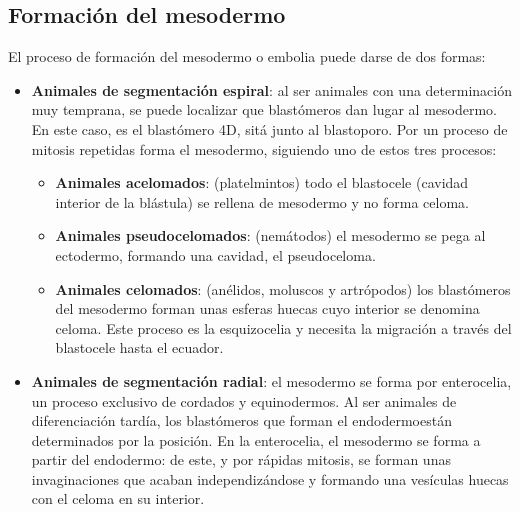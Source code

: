 \subsection{Formación del mesodermo}
El proceso de formación del mesodermo o embolia puede darse de dos formas:
\begin{itemize}[itemsep=0pt,parsep=0pt,topsep=0pt,partopsep=0pt]
    \item \textbf{Animales de segmentación espiral}: al ser animales con una determinación muy temprana, se puede localizar que blastómeros dan lugar al mesodermo. En este caso, es el blastómero 4D, sitá junto al blastoporo. Por un proceso de mitosis repetidas forma el mesodermo, siguiendo uno de estos tres procesos:
    \begin{itemize}[itemsep=0pt,parsep=0pt,topsep=0pt,partopsep=0pt]
        \item \textbf{Animales acelomados}: (platelmintos) todo el blastocele (cavidad interior de la blástula) se rellena de mesodermo y no forma celoma.
        \item\textbf{Animales pseudocelomados}: (nemátodos) el mesodermo se pega al ectodermo, formando una cavidad, el pseudoceloma.
        \item\textbf{Animales celomados}: (anélidos, moluscos y artrópodos) los blastómeros del mesodermo forman unas esferas huecas cuyo interior se denomina celoma. Este proceso es la esquizocelia y necesita la migración a través del blastocele hasta el ecuador.
    \end{itemize}
    \item\textbf{Animales de segmentación radial}: el mesodermo se forma por enterocelia, un proceso exclusivo de cordados y equinodermos. Al ser animales de diferenciación tardía, los blastómeros que forman el endodermoestán determinados por la posición. En la enterocelia, el mesodermo se forma a partir del endodermo: de este, y por rápidas mitosis, se forman unas invaginaciones que acaban independizándose y formando una vesículas huecas con el celoma en su interior. 
\end{itemize}
